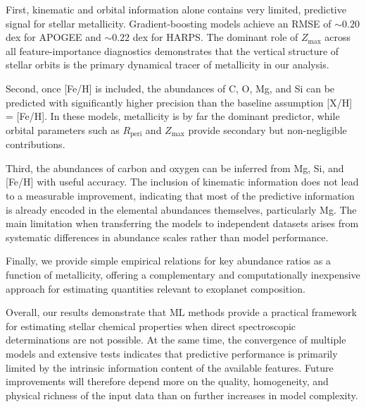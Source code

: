 \documentclass{aa}
\begin{document}
First, kinematic and orbital information alone contains very limited, predictive signal for stellar metallicity. Gradient-boosting models achieve an RMSE of $\sim0.20$ dex for APOGEE and $\sim0.22$ dex for HARPS. The dominant role of $Z_{\mathrm{max}}$ across all feature-importance diagnostics demonstrates that the vertical structure of stellar orbits is the primary dynamical tracer of metallicity in our analysis.

Second, once [Fe/H] is included, the abundances of C, O, Mg, and Si can be predicted with significantly higher precision than the baseline assumption [X/H] = [Fe/H]. In these models, metallicity is by far the dominant predictor, while orbital parameters such as $R_{\mathrm{peri}}$ and $Z_{\mathrm{max}}$ provide secondary but non-negligible contributions.

Third, the abundances of carbon and oxygen can be inferred from Mg, Si, and [Fe/H] with useful accuracy. The inclusion of kinematic information does not lead to a measurable improvement, indicating that most of the predictive information is already encoded in the elemental abundances themselves, particularly Mg. The main limitation when transferring the models to independent datasets arises from systematic differences in abundance scales rather than model performance.

Finally, we provide simple empirical relations for key abundance ratios as a function of metallicity, offering a complementary and computationally inexpensive approach for estimating quantities relevant to exoplanet composition.

Overall, our results demonstrate that ML methods provide a practical framework for estimating stellar chemical properties when direct spectroscopic determinations are not possible. At the same time, the convergence of multiple models and extensive tests indicates that predictive performance is primarily limited by the intrinsic information content of the available features. Future improvements will therefore depend more on the quality, homogeneity, and physical richness of the input data than on further increases in model complexity.
\end{document}
